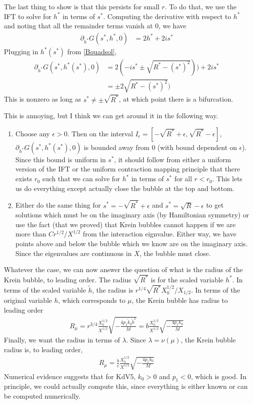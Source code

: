 \documentclass[thesis.tex]{subfiles}
\begin{document}
The last thing to show is that this persists for small $r$. To do that, we use the IFT to solve for $h^*$ in terms of $s^*$. Computing the derivative with respect to $h^*$ and noting that all the remainder terms vanish at 0, we have
\begin{align*}
\partial_{h^*} G(s^*, h^*, 0) 
&= 2 h^* + 2 i s^*
\end{align*}
Plugging in $h^*(s^*)$ from \cref{Bquadsol},
\begin{align*}
\partial_{h^*} G(s^*, h^*(s^*), 0) 
&= 2 (-i s^* \pm \sqrt{R^* - (s^*)^2 })) + 2 i s^* \\
&= \pm 2 \sqrt{R^* - (s^*)^2 })
\end{align*}
This is nonzero as long as $s^* \neq \pm \sqrt{R^*}$, at which point there is a bifurcation. 

This is annoying, but I think we can get around it in the following way.
\begin{enumerate}
\item Choose any $\epsilon > 0$. Then on the interval $I_\epsilon = [-\sqrt{R^*} + \epsilon, \sqrt{R^*} - \epsilon]$, $\partial_{h^*} G(s^*, h^*(s^*), 0)$ is bounded away from 0 (with bound dependent on $\epsilon$). Since this bound is uniform in $s^*$, it should follow from either a uniform version of the IFT or the uniform contraction mapping principle that there exists $r_0$ such that we can solve for $h^*$ in terms of $s^*$ for all $r < r_0$. This lets us do everything except actually close the bubble at the top and bottom.

\item Either do the same thing for $s^* = -\sqrt{R^*} + \epsilon$ and $s^* = \sqrt{R} - \epsilon$ to get solutions which must be on the imaginary axis (by Hamiltonian symmetry) or use the fact (that we proved) that Krein bubbles cannot happen if we are more than $C r^{1/2}/X^{1/2}$ from the interaction eignvalue. Either way, we have points above and below the bubble which we know are on the imaginary axis. Since the eigenvalues are continuous in $X$, the bubble must close.
\end{enumerate} 

Whatever the case, we can now answer the question of what is the radius of the Krein bubble, to leading order. The radius $\sqrt{R^*}$ is for the scaled variable $h^*$. In terms of the scaled variable $\tilde{h}$, the radius is $r^{1/4} \sqrt{R^*} X_0^{1/2}/X_{1/2}$. In terms of the original variable $h$, which corresponds to $\mu$, the Krein bubble has radius to leading order
\begin{align*}
R_\mu = r^{3/4}\frac{X_0^{1/2}}{X^{1/2}} \sqrt{-\frac{4 p_1 \tilde{k}_0 \tilde{b}^2 }{M}} = b \frac{X_0^{1/2}}{X^{1/2}} \sqrt{-\frac{4 p_1 k_0 }{M}} 
\end{align*}
Finally, we want the radius in terms of $\lambda$. Since $\lambda = \nu(\mu)$, the Krein bubble radius is, to leading order,
\begin{align*}
R_\mu = \frac{b}{c}  \frac{X_0^{1/2}}{X^{1/2}} \sqrt{-\frac{4 p_1 k_0 }{M}} 
\end{align*}
Numerical evidence suggests that for KdV5, $k_0 > 0$ and $p_1 < 0$, which is good. In principle, we could actually compute this, since everything is either known or can be computed numerically.
\end{document}
